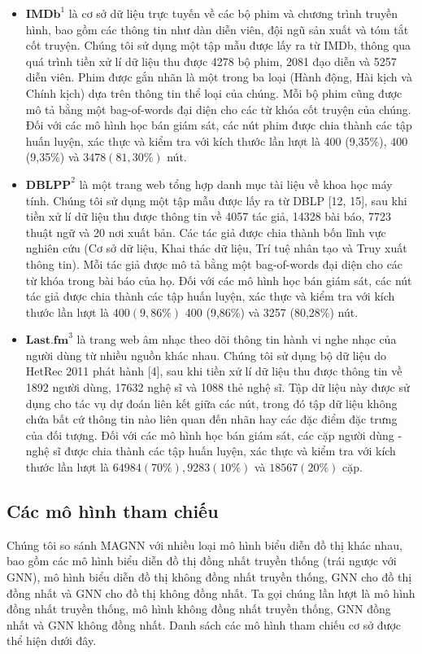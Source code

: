 \begin{itemize}
  \item $\mathbf{IMDb}^{1}$ là cơ sở dữ liệu trực tuyến về các bộ phim và chương trình truyền hình, bao gồm các thông tin như dàn diễn viên, đội ngũ sản xuất và tóm tắt cốt truyện. Chúng tôi sử dụng một tập mẫu được lấy ra từ IMDb, thông qua quá trình tiền xử lí dữ liệu thu được 4278 bộ phim, 2081 đạo diễn và 5257 diễn viên. Phim được gắn nhãn là một trong ba loại (Hành động, Hài kịch và Chính kịch) dựa trên thông tin thể loại của chúng. Mỗi bộ phim cũng được mô tả bằng một bag-of-words đại diện cho các từ khóa cốt truyện của chúng. Đối với các mô hình học bán giám sát, các nút phim được chia thành các tập huấn luyện, xác thực và kiểm tra với kích thước lần lượt là 400 (9,35\%), 400 (9,35\%) và $3478(81,30 \%)$ nút.
  \item $\mathbf{DBLPP}^{2}$ là một trang web tổng hợp danh mục tài liệu về khoa học máy tính. Chúng tôi sử dụng một tập mẫu được lấy ra từ DBLP [12, 15], sau khi tiền xử lí dữ liệu thu được thông tin về 4057 tác giả, 14328 bài báo, 7723 thuật ngữ và 20 nơi xuất bản. Các tác giả được chia thành bốn lĩnh vực nghiên cứu (Cơ sở dữ liệu, Khai thác dữ liệu, Trí tuệ nhân tạo và Truy xuất thông tin). Mỗi tác giả được mô tả bằng một bag-of-words đại diện cho các từ khóa trong bài báo của họ. Đối với các mô hình học bán giám sát, các nút tác giả được chia thành các tập huấn luyện, xác thực và kiểm tra với kích thước lần lượt là $400(9,86 \%)$ 400 (9,86\%) và 3257 (80,28\%) nút.
  \item $\mathbf{Last.fm}^{3}$ là trang web âm nhạc theo dõi thông tin hành vi nghe nhạc của người dùng từ nhiều nguồn khác nhau. Chúng tôi sử dụng bộ dữ liệu do HetRec 2011 phát hành [4], sau khi tiền xử lí dữ liệu thu được thông tin về 1892 người dùng, 17632 nghệ sĩ và 1088 thẻ nghệ sĩ. Tập dữ liệu này được sử dụng cho tác vụ dự đoán liên kết giữa các nút, trong đó tập dữ liệu không chứa bất cứ thông tin nào liên quan đến nhãn hay các đặc điểm đặc trưng của đối tượng. Đối với các mô hình học bán giám sát, các cặp người dùng - nghệ sĩ được chia thành các tập huấn luyện, xác thực và kiểm tra với kích thước lần lượt là $64984(70 \%), 9283(10 \%)$ và $18567(20 \%)$ cặp.
\end{itemize}

\subsection{Các mô hình tham chiếu}
Chúng tôi so sánh MAGNN với nhiều loại mô hình biểu diễn đồ thị khác nhau, bao gồm các mô hình biểu diễn đồ thị đồng nhất truyền thống (trái ngược với GNN), mô hình biểu diễn đồ thị không đồng nhất truyền thống, GNN cho đồ thị đồng nhất và GNN cho đồ thị không đồng nhất. Ta gọi chúng lần lượt là mô hình đồng nhất truyền thống, mô hình không đồng nhất truyền thống, GNN đồng nhất và GNN không đồng nhất. Danh sách các mô hình tham chiếu cơ sở được thể hiện dưới đây.

